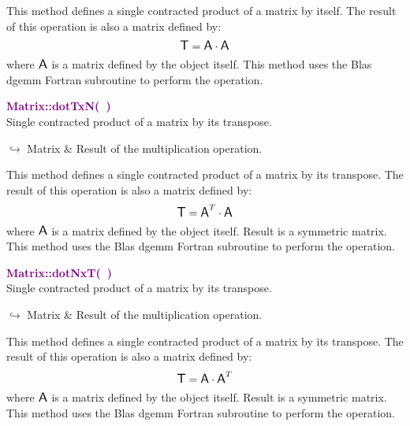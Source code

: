 This method defines a single contracted product of a matrix by itself.
The result of this operation is also a matrix defined by:
\begin{equation*}
\mbox{\large\ensuremath{\mathsf{T}}} = \mbox{\large\ensuremath{\mathsf{A}}} \cdot \mbox{\large\ensuremath{\mathsf{A}}}
\end{equation*}
where $\mbox{\large\ensuremath{\mathsf{A}}}$ is a matrix defined by the object itself.
This method uses the Blas \textsf{dgemm} Fortran subroutine to perform the operation.

\textcolor{purple}{\textbf{Matrix::dotTxN(~)}}\label{Matrix::dotTxN()}\\
Single contracted product of a matrix by its transpose.\vspace*{-0.5em}
\begin{tcolorbox}[grow to left by=-1cm, width=\textwidth-1cm,myArgs,tabularx={l|R}]
$\hookrightarrow$ Matrix & Result of the multiplication operation.
\end{tcolorbox}

This method defines a single contracted product of a matrix by its transpose.
The result of this operation is also a matrix defined by:
\begin{equation*}
\mbox{\large\ensuremath{\mathsf{T}}} = \mbox{\large\ensuremath{\mathsf{A}}}^T\cdot \mbox{\large\ensuremath{\mathsf{A}}}
\end{equation*}
where $\mbox{\large\ensuremath{\mathsf{A}}}$ is a matrix defined by the object itself. Result is a symmetric matrix.
This method uses the Blas \textsf{dgemm} Fortran subroutine to perform the operation.

\textcolor{purple}{\textbf{Matrix::dotNxT(~)}}\label{Matrix::dotNxT()}\\
Single contracted product of a matrix by its transpose.\vspace*{-0.5em}
\begin{tcolorbox}[grow to left by=-1cm, width=\textwidth-1cm,myArgs,tabularx={l|R}]
$\hookrightarrow$ Matrix & Result of the multiplication operation.
\end{tcolorbox}

This method defines a single contracted product of a matrix by its transpose.
The result of this operation is also a matrix defined by:
\begin{equation*}
\mbox{\large\ensuremath{\mathsf{T}}} = \mbox{\large\ensuremath{\mathsf{A}}} \cdot \mbox{\large\ensuremath{\mathsf{A}}}^T
\end{equation*}
where $\mbox{\large\ensuremath{\mathsf{A}}}$ is a matrix defined by the object itself. Result is a symmetric matrix.
This method uses the Blas \textsf{dgemm} Fortran subroutine to perform the operation.

